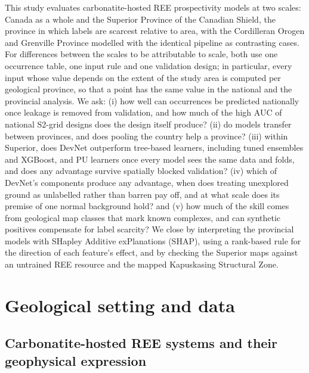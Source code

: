 \documentclass[pdflatex,sn-apa]{sn-jnl}
\begin{document}
This study evaluates carbonatite-hosted REE prospectivity models at two scales: Canada as a whole and the Superior Province of the Canadian Shield, the province in which labels are scarcest relative to area, with the Cordilleran Orogen and Grenville Province modelled with the identical pipeline as contrasting cases. For differences between the scales to be attributable to scale, both use one occurrence table, one input rule and one validation design; in particular, every input whose value depends on the extent of the study area is computed per geological province, so that a point has the same value in the national and the provincial analysis. We ask: (i) how well can occurrences be predicted nationally once leakage is removed from validation, and how much of the high AUC of national S2-grid designs does the design itself produce? (ii) do models transfer between provinces, and does pooling the country help a province? (iii) within Superior, does DevNet outperform tree-based learners, including tuned ensembles and XGBoost, and PU learners once every model sees the same data and folds, and does any advantage survive spatially blocked validation? (iv) which of DevNet's components produce any advantage, when does treating unexplored ground as unlabelled rather than barren pay off, and at what scale does its premise of one normal background hold? and (v) how much of the skill comes from geological map classes that mark known complexes, and can synthetic positives compensate for label scarcity? We close by interpreting the provincial models with SHapley Additive exPlanations (SHAP), using a rank-based rule for the direction of each feature's effect, and by checking the Superior maps against an untrained REE resource and the mapped Kapuskasing Structural Zone.

\section{Geological setting and data}\label{sec:data}

\subsection{Carbonatite-hosted REE systems and their geophysical expression}\label{sec:mineral-system}
\end{document}
